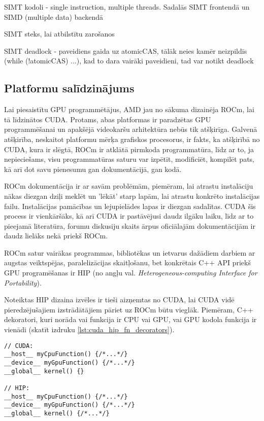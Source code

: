\documentclass[12pt]{report}%
\theoremstyle{definition}
\begin{document}
SIMT kodoli - single instruction, multiple threads. Sadalās SIMT frontendā un SIMD (multiple data) backendā

SIMT steks, lai atbilstītu zarošanos

SIMT deadlock - paveidiens gaida uz atomicCAS, tālāk neies kamēr neizpildīs (while (!atomicCAS) ...), kad to dara vairāki paveidieni, tad var notikt deadlock

\begin{center}
\chapter{Platformu salīdzinājums}
\end{center}
Lai piesaistītu GPU programmētājus, AMD jau no sākuma dizainēja ROCm, lai tā līdzinātos CUDA. Protams,
abas platformas ir paradzētas GPU programmēšanai un apakšējā videokaršu arhitektūra nebūs tik atšķirīga.
Galvenā atšķirība, neskaitot platformu mērķa grafiskos procesorus, ir fakts, ka atšķirībā no CUDA, kura
ir slēgtā, ROCm ir atklātā pirmkoda programmatūra, līdz ar to, ja nepieciešams, visu programmatūras saturu 
var izpētīt, modificiēt, kompilēt pats, kā arī dot savu pienesumu gan dokumentācijā, gan kodā.\cite{what_is_ROCM}

ROCm dokumentācija ir ar savām problēmām, piemēram, lai atrastu instalāciju nākas diezgan dziļi meklēt
un 'lēkāt' starp lapām, lai atrastu konkrēto instalācijas failu. Instalācijas pamācības un lejupielādes
lapas ir diezgan sadalītas. CUDA šis process ir vienkāršāks, kā arī CUDA ir pastāvējusi daudz ilgāku
laiku, līdz ar to pieejamā literatūra, forumu diskusiju skaits ārpus oficiālajām dokumentācijām ir daudz 
lielāks nekā priekš ROCm.

ROCm satur vairākas programmas, bibliotēkas un ietvarus dažādiem darbiem ar augstas veiktspējas,
paralelizācijas skaitļošanu, bet konkrētais C++ API priekš GPU programēšanas ir HIP (no angļu val.
\textit{Heterogeneous-computing Interface for Portability}).\cite{HIP_docs}

Noteiktas HIP dizaina izvēles ir tieši aizņemtas no CUDA, lai CUDA vidē pieredzējušajiem
izstrādātājiem pāriet uz ROCm būtu vieglāk. Piemēram, C++ dekoratori, kuri norāda vai funkcija ir CPU
vai GPU, vai GPU kodola funkcija ir vienādi (skatīt  izdruku \ref{lst:cuda_hip_fn_decorators}).

\begin{lstlisting}[caption={CUDA un HIP funkciju definīciju salīdzinājums},
  label=lst:cuda_hip_fn_decorators,
  captionpos=t
]
// CUDA:
__host__ myCpuFunction() {/*...*/}
__device__ myGpuFunction() {/*...*/}
__global__ kernel() {}

// HIP:
__host__ myCpuFunction() {/*...*/}
__device__ myGpuFunction() {/*...*/}
__global__ kernel() {/*...*/}
\end{lstlisting}
\end{document}
